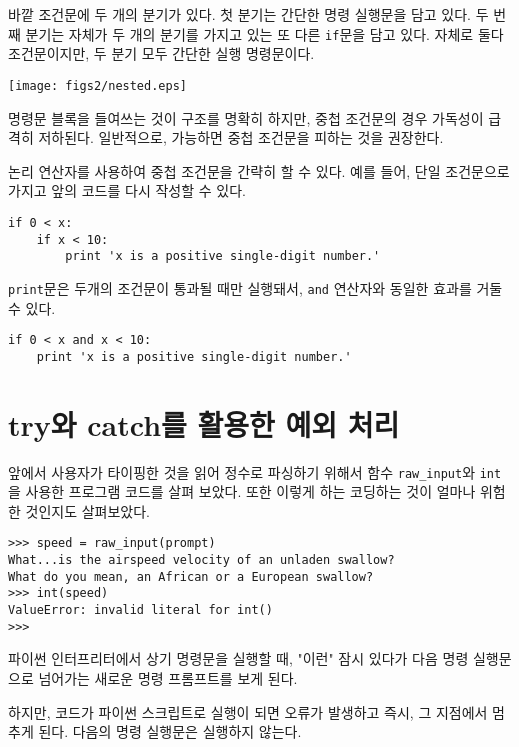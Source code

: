 바깥 조건문에 두 개의 분기가 있다. 첫 분기는 간단한 명령 실행문을 담고 있다. 두 번째 분기는 자체가 두 개의 분기를 가지고 있는 또 다른 {\tt if}문을 담고 있다.
자체로 둘다 조건문이지만, 두 분기 모두 간단한 실행 명령문이다.

\beforefig
\centerline{\texttt{[image: figs2/nested.eps]}}
\afterfig

명령문 블록을 들여쓰는 것이 구조를 명확히 하지만, 중첩 조건문의 경우 가독성이 급격히 저하된다. 일반적으로, 가능하면 중첩 조건문을 피하는 것을 권장한다.

논리 연산자를 사용하여 중첩 조건문을 간략히 할 수 있다. 예를 들어, 단일 조건문으로 가지고 앞의 코드를 다시 작성할 수 있다.

\beforeverb
\begin{verbatim}
if 0 < x:
    if x < 10:
        print 'x is a positive single-digit number.'
\end{verbatim}
\afterverb
%

{\tt print}문은 두개의 조건문이 통과될 때만 실행돼서, {\tt and} 연산자와 동일한 효과를 거둘 수 있다.

\beforeverb
\begin{verbatim}
if 0 < x and x < 10:
    print 'x is a positive single-digit number.'
\end{verbatim}
\afterverb


\section{try와 catch를 활용한 예외 처리}

앞에서 사용자가 타이핑한 것을 읽어 정수로 파싱하기 위해서 함수 \verb"raw_input"와 {\tt int}을 사용한 프로그램 코드를 살펴 보았다.
또한 이렇게 하는 코딩하는 것이 얼마나 위험한 것인지도 살펴보았다.

\beforeverb
\begin{verbatim}
>>> speed = raw_input(prompt)
What...is the airspeed velocity of an unladen swallow?
What do you mean, an African or a European swallow?
>>> int(speed)
ValueError: invalid literal for int()
>>>
\end{verbatim}
\afterverb
%
파이썬 인터프리터에서 상기 명령문을 실행할 때, "이런" 잠시 있다가 다음 명령 실행문으로 넘어가는 새로운 명령 프롬프트를 보게 된다.

하지만, 코드가 파이썬 스크립트로 실행이 되면 오류가 발생하고 즉시, 그 지점에서 멈추게 된다. 다음의 명령 실행문은 실행하지 않는다.


